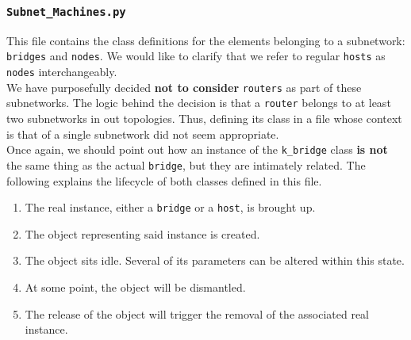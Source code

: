             \subsubsection{\texttt{Subnet\_Machines.py}}
                This file contains the class definitions for the elements belonging to a subnetwork: \texttt{bridges} and \texttt{nodes}. We would like to clarify that we refer to regular \texttt{hosts} as \texttt{nodes} interchangeably.\\

                We have purposefully decided \textbf{not to consider} \texttt{routers} as part of these subnetworks. The logic behind the decision is that a \texttt{router} belongs to at least two subnetworks in out topologies. Thus, defining its class in a file whose context is that of a single subnetwork did not seem appropriate.\\

                Once again, we should point out how an instance of the \texttt{k\_bridge} class \textbf{is not} the same thing as the actual \texttt{bridge}, but they are intimately related. The following explains the lifecycle of both classes defined in this file.\\

                \begin{enumerate}
                    \item The real instance, either a \texttt{bridge} or a \texttt{host}, is brought up.
                    \item The object representing said instance is created.
                    \item The object sits idle. Several of its parameters can be altered within this state.
                    \item At some point, the object will be dismantled.
                    \item The release of the object will trigger the removal of the associated real instance.
                \end{enumerate}

